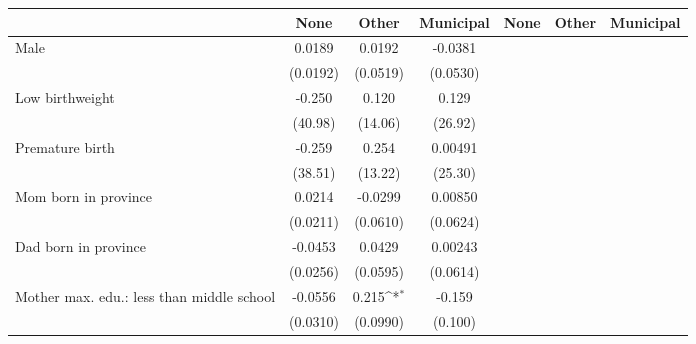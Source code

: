 {
\def\sym#1{\ifmmode^{#1}\else\(^{#1}\)\fi}
\begin{tabular}{l*{6}{c}}
\toprule
                    &\multicolumn{1}{c}{None}&\multicolumn{1}{c}{Other}&\multicolumn{1}{c}{Municipal}&\multicolumn{1}{c}{None}&\multicolumn{1}{c}{Other}&\multicolumn{1}{c}{Municipal}\\
\midrule
Male                &      0.0189         &      0.0192         &     -0.0381         &                     &                     &                     \\
                    &    (0.0192)         &    (0.0519)         &    (0.0530)         &                     &                     &                     \\
\addlinespace
Low birthweight     &      -0.250         &       0.120         &       0.129         &                     &                     &                     \\
                    &     (40.98)         &     (14.06)         &     (26.92)         &                     &                     &                     \\
\addlinespace
Premature birth     &      -0.259         &       0.254         &     0.00491         &                     &                     &                     \\
                    &     (38.51)         &     (13.22)         &     (25.30)         &                     &                     &                     \\
\addlinespace
Mom born in province&      0.0214         &     -0.0299         &     0.00850         &                     &                     &                     \\
                    &    (0.0211)         &    (0.0610)         &    (0.0624)         &                     &                     &                     \\
\addlinespace
Dad born in province&     -0.0453         &      0.0429         &     0.00243         &                     &                     &                     \\
                    &    (0.0256)         &    (0.0595)         &    (0.0614)         &                     &                     &                     \\
\addlinespace
Mother max. edu.: less than middle school&     -0.0556         &       0.215\sym{*}  &      -0.159         &                     &                     &                     \\
                    &    (0.0310)         &    (0.0990)         &     (0.100)         &                     &                     &                     \\

\end{tabular}}
